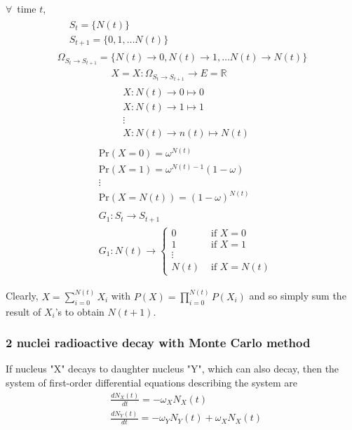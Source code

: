 \documentclass[10pt]{amsart}
\begin{document}
\begin{multicols*}{2}
$\forall \, $ time $t$, 
\[
\begin{gathered} 
\begin{aligned}
& S_t = \lbrace N(t) \rbrace \\ 
& S_{t+1} = \lbrace 0 , 1, \dots N(t) \rbrace 
\end{aligned} \\
\Omega_{S_t \to S_{t+1} }  = \lbrace N(t) \to 0 , N(t) \to 1, \dots N(t) \to N(t) \rbrace 
\end{gathered} 
\]
\[
\begin{gathered} 
X = X: \Omega_{S_t \to S_{t+1} } \to E =\mathbb{R} \\
\begin{aligned} 
	& X : N(t) \to 0 \mapsto 0 \\ 
	& X :N(t) \to 1 \mapsto 1 \\ 
	& \vdots \\ 
	& X:N(t) \to n(t) \mapsto N(t)
\end{aligned} 
\end{gathered} 
\]
\[
\begin{gathered}
\begin{aligned}
& \text{Pr}(X =0) = \omega^{N(t)} \\
& \text{Pr}(X=1) = \omega^{N(t) - 1} (1- \omega) \\
& \vdots \\
& \text{Pr}(X =N(t)) = (1- \omega)^{N(t)}
\end{aligned} \\
\begin{aligned}
& G_1 : S_t \to S_{t+1} \\
& G_1 : N(t) \to \begin{cases}0 & \text{ if } X = 0 \\
1 & \text{ if } X = 1 \\ 
\vdots & \\
N(t) & \text{ if } X = N(t)  \end{cases} 
\end{aligned}
\end{gathered}
\]

Clearly, $X = \sum_{i=0}^{N(t)} X_i $ with $P(X) = \prod_{i=0}^{N(t)} P(X_i)$ and so simply sum the result of $X_i$'s to obtain $N(t+1)$. 

\subsubsection{2 nuclei radioactive decay with Monte Carlo method}

If nucleus "X" decays to daughter nucleus "Y", which can also decay, then the system of first-order differential equations describing the system are
\[
\begin{aligned} 
	& \frac{dN_X(t)}{dt} = -\omega_X N_X(t) \\ 
	& \frac{dN_Y(t)}{dt} = -\omega_Y N_Y(t) + \omega_X N_X(t)
\end{aligned} 
\]


\end{multicols*}
\end{document}
